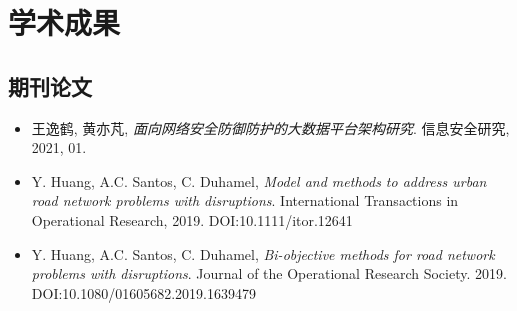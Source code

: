 \documentclass[letterpaper]{twentysecondcv} %
\begin{document}
\vspace{-0.2cm}
\section{学术成果}

\vspace{-0.2cm}
\subsection{期刊论文}
\begin{itemize}
    \item 王逸鹤, 黄亦芃, \textit{面向网络安全防御防护的大数据平台架构研究}. 信息安全研究, 2021, 01.
    \item Y. Huang, A.C. Santos, C. Duhamel, \textit{Model and methods to address urban road network problems with disruptions}. International Transactions in Operational Research, 2019. DOI:10.1111/itor.12641
    \item Y. Huang, A.C. Santos, C. Duhamel, \textit{Bi-objective methods for road network problems with disruptions}. Journal of the Operational Research Society. 2019. DOI:10.1080/01605682.2019.1639479
\end{itemize}

\vspace{-0.1cm}
\end{document}
